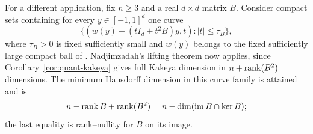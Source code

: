 For a different application, fix \(n\ge3\) and a real \(d\times d\)
matrix \(B\). Consider compact sets containing for every
\(y\in[-1,1]^d\) one curve
\[
           \{(w(y)+(tI_d+t^2 B)y,t):|t|\le\tau_B\},
\]
where \(\tau_B>0\) is fixed sufficiently small and \(w(y)\) belongs
to the fixed sufficiently large compact ball of
\cite[Equation~(1.16)]{Nadjimzadah2026}. Nadjimzadah's lifting
theorem \cite[Theorem 1.3]{Nadjimzadah2026} now applies, since
Corollary~\ref{cor:quant-kakeya} gives full Kakeya dimension in
\(n+\operatorname{rank}(B^2)\) dimensions. The minimum Hausdorff dimension in
this curve family is attained and is
\[
 n-\operatorname{rank} B+\operatorname{rank}(B^2)=n-\dim(\operatorname{im}B\cap\ker B);
\]
the last equality is rank--nullity for \(B\) on its image.
